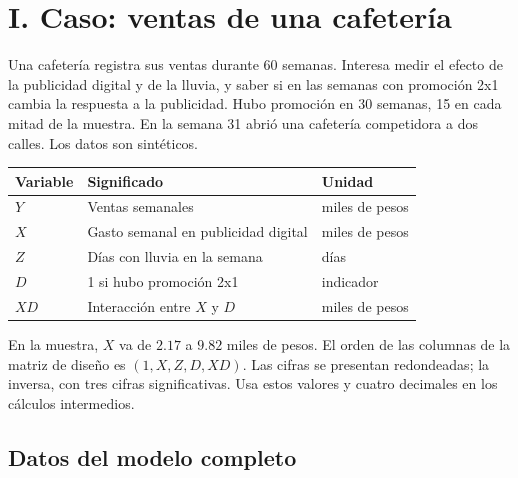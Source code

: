 \section*{I. Caso: ventas de una cafetería}

Una cafetería registra sus ventas durante 60 semanas. Interesa medir el efecto de la publicidad digital y de la lluvia, y saber si en las semanas con promoción 2x1 cambia la respuesta a la publicidad. Hubo promoción en 30 semanas, 15 en cada mitad de la muestra. En la semana 31 abrió una cafetería competidora a dos calles. Los datos son sintéticos.

\begin{center}
\begin{tabular}{@{}lll@{}}
\toprule
Variable & Significado & Unidad\\
\midrule
$Y$ & Ventas semanales & miles de pesos\\
$X$ & Gasto semanal en publicidad digital & miles de pesos\\
$Z$ & Días con lluvia en la semana & días\\
$D$ & 1 si hubo promoción 2x1 & indicador\\
$XD$ & Interacción entre $X$ y $D$ & miles de pesos\\
\bottomrule
\end{tabular}
\end{center}

En la muestra, $X$ va de $2.17$ a $9.82$ miles de pesos. El orden de las columnas de la matriz de diseño es $(1,X,Z,D,XD)$. Las cifras se presentan redondeadas; la inversa, con tres cifras significativas. Usa estos valores y cuatro decimales en los cálculos intermedios.

\subsection*{Datos del modelo completo}

